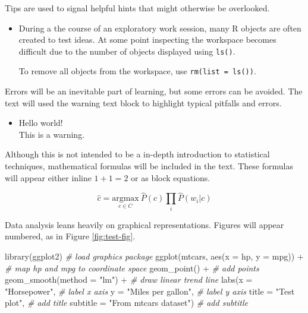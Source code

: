 \documentclass[
]{article}
\newenvironment{Shaded}{\begin{snugshade}}{\end{snugshade}}
\newcommand{\AttributeTok}[1]{\textcolor[rgb]{0.77,0.63,0.00}{#1}}
\newcommand{\CommentTok}[1]{\textcolor[rgb]{0.56,0.35,0.01}{\textit{#1}}}
\newcommand{\FunctionTok}[1]{\textcolor[rgb]{0.00,0.00,0.00}{#1}}
\newcommand{\NormalTok}[1]{#1}
\newcommand{\SpecialCharTok}[1]{\textcolor[rgb]{0.00,0.00,0.00}{#1}}
\newcommand{\StringTok}[1]{\textcolor[rgb]{0.31,0.60,0.02}{#1}}
\newenvironment{rmdblock}[1]
  {\begin{shaded*}
  \begin{itemize}
  \renewcommand{\labelitemi}{
    \raisebox{-.5\height}[0pt][0pt]{
      {\setkeys{Gin}{width=2em,keepaspectratio}\texttt{[image: assets/images/\#1]}}
    }
  }
  \item
  }
  {
  \end{itemize}
  \end{shaded*}
  }
\newenvironment{rmdtip}
  {\begin{rmdblock}{tip}}
  {\end{rmdblock}}
\newenvironment{rmdwarning}
  {\begin{rmdblock}{warning}}
  {\end{rmdblock}}
\begin{document}
Tips are used to signal helpful hints that might otherwise be overlooked.

\begin{rmdtip}
During a the course of an exploratory work session, many R objects are
often created to test ideas. At some point inspecting the workspace
becomes difficult due to the number of objects displayed using
\texttt{ls()}.

To remove all objects from the workspace, use
\texttt{rm(list\ =\ ls())}.
\end{rmdtip}

Errors will be an inevitable part of learning, but some errors can be avoided. The text will used the warning text block to highlight typical pitfalls and errors.

\begin{rmdwarning}
Hello world!\\
This is a warning.
\end{rmdwarning}

Although this is not intended to be a in-depth introduction to statistical techniques, mathematical formulas will be included in the text. These formulas will appear either inline \(1 + 1 = 2\) or as block equations.

\begin{equation}
  \hat{c} = \underset{c \in C} {\mathrm{argmax}} ~\hat{P}(c) \prod_i \hat{P}(w_i|c)
  \label{eq:example-formula}
\end{equation}

Data analysis leans heavily on graphical representations. Figures will appear numbered, as in Figure \ref{fig:test-fig}.

\begin{Shaded}
\begin{Highlighting}[]
\FunctionTok{library}\NormalTok{(ggplot2) }\CommentTok{\# load graphics package}
\FunctionTok{ggplot}\NormalTok{(mtcars, }\FunctionTok{aes}\NormalTok{(}\AttributeTok{x =}\NormalTok{ hp, }\AttributeTok{y =}\NormalTok{ mpg)) }\SpecialCharTok{+} \CommentTok{\# map \textquotesingle{}hp\textquotesingle{} and \textquotesingle{}mpg\textquotesingle{} to coordinate space}
  \FunctionTok{geom\_point}\NormalTok{() }\SpecialCharTok{+} \CommentTok{\# add points}
  \FunctionTok{geom\_smooth}\NormalTok{(}\AttributeTok{method =} \StringTok{"lm"}\NormalTok{) }\SpecialCharTok{+} \CommentTok{\# draw linear trend line}
  \FunctionTok{labs}\NormalTok{(}\AttributeTok{x =} \StringTok{"Horsepower"}\NormalTok{, }\CommentTok{\# label x axis}
       \AttributeTok{y =} \StringTok{"Miles per gallon"}\NormalTok{, }\CommentTok{\# label y axis}
       \AttributeTok{title =} \StringTok{"Test plot"}\NormalTok{, }\CommentTok{\# add title}
       \AttributeTok{subtitle =} \StringTok{"From mtcars dataset"}\NormalTok{) }\CommentTok{\# add subtitle}
\end{Highlighting}
\end{Shaded}
\end{document}

